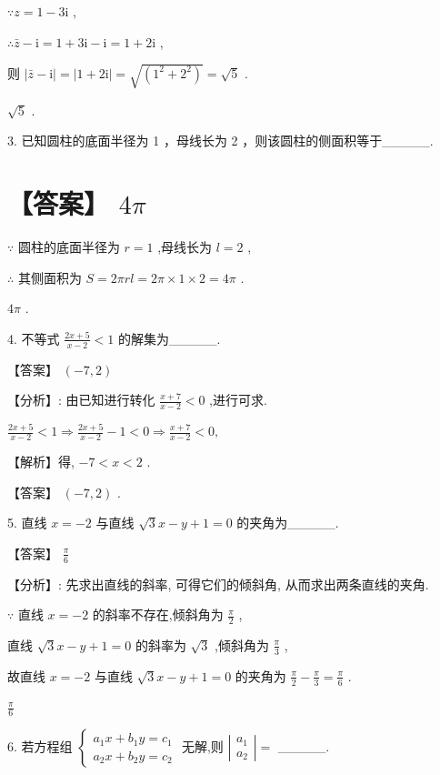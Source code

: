 \documentclass[10pt]{article}
\begin{document}
\(\because z = 1 - 3\mathrm{i}\) ,

\(\therefore \bar{z} - \mathrm{i} = 1 + 3\mathrm{i} - \mathrm{i} = 1 + 2\mathrm{i}\) ,

则 \(\left| {\bar{z} - \mathrm{i}}\right|  = \left| {1 + 2\mathrm{i}}\right|  = \sqrt{\left( {1}^{2} + {2}^{2}\right) } = \sqrt{5}\) .

\(\sqrt{5}\) .

3. 已知圆柱的底面半径为 1 ，母线长为 2 ，则该圆柱的侧面积等于\_\_\_\_\_.

\section*{【答案】 \({4\pi }\)}

\(\because\) 圆柱的底面半径为 \(r = 1\) ,母线长为 \(l = 2\) ,

\(\therefore\) 其侧面积为 \(S = {2\pi rl} = {2\pi } \times  1 \times  2 = {4\pi }\) .

\({4\pi }\) .

4. 不等式 \(\frac{{2x} + 5}{x - 2} < 1\) 的解集为\_\_\_\_\_.

【答案】 \(\left( {-7,2}\right)\)

【分析】: 由已知进行转化 \(\frac{x + 7}{x - 2} < 0\) ,进行可求.

\(\frac{{2x} + 5}{x - 2} < 1 \Rightarrow  \frac{{2x} + 5}{x - 2} - 1 < 0 \Rightarrow  \frac{x + 7}{x - 2} < 0,\)

【解析】得, \(- 7 < x < 2\) .

【答案】 \(\left( {-7,2}\right)\) .

5. 直线 \(x =  - 2\) 与直线 \(\sqrt{3}x - y + 1 = 0\) 的夹角为\_\_\_\_\_.

【答案】 \(\frac{\pi }{6}\)

【分析】: 先求出直线的斜率, 可得它们的倾斜角, 从而求出两条直线的夹角.

\(\because\) 直线 \(x =  - 2\) 的斜率不存在,倾斜角为 \(\frac{\pi }{2}\) ,

直线 \(\sqrt{3}x - y + 1 = 0\) 的斜率为 \(\sqrt{3}\) ,倾斜角为 \(\frac{\pi }{3}\) ,

故直线 \(x =  - 2\) 与直线 \(\sqrt{3}x - y + 1 = 0\) 的夹角为 \(\frac{\pi }{2} - \frac{\pi }{3} = \frac{\pi }{6}\) .

\(\frac{\pi }{6}\)

6. 若方程组 \(\left\{  \begin{array}{l} {a}_{1}x + {b}_{1}y = {c}_{1} \\  {a}_{2}x + {b}_{2}y = {c}_{2} \end{array}\right.\) 无解,则 \(\left| \begin{array}{l} {a}_{1} \\  {a}_{2} \end{array}\right|  =\) \_\_\_\_\_.
\end{document}
